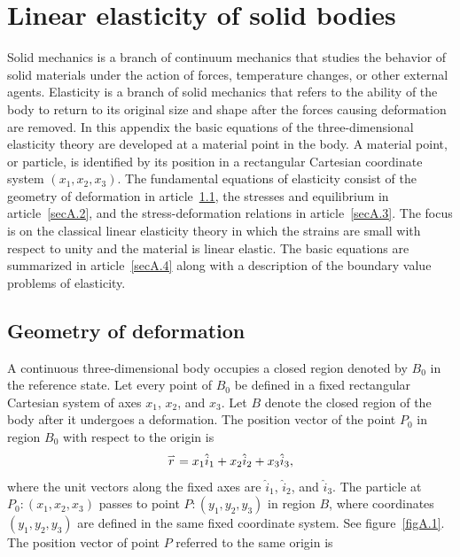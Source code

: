 \documentclass{AeroStructure-ERJohnson}
\def\harp#1{\smash{\mathord{\buildrel{\lower3pt\hbox{$\scriptscriptstyle\rightharpoonup$}}\over{#1}}}}
\begin{document}
\mainmatter



\appendix

\chapter{Linear elasticity of solid bodies} \label{appendix}

Solid mechanics is a branch of continuum mechanics that studies the behavior of solid materials under the action of forces, temperature changes, or other external agents. Elasticity is a branch of solid mechanics that refers to the ability of the body to return to its original size and shape after the forces causing deformation are removed. In this appendix the basic equations of the three-dimensional elasticity theory are developed at a material point in the body. A material point, or particle, is identified by its position in a rectangular Cartesian coordinate system $(x_{1},x_{2},x_{3})$. The fundamental equations of elasticity consist of the geometry of deformation in article~\ref{secA.1}, the stresses and equilibrium in article~\ref{secA.2}, and the stress-deformation relations in article~\ref{secA.3}. The focus is on the classical linear elasticity theory in which the strains are small with respect to unity and the material is linear elastic. The basic equations are summarized in article~\ref{secA.4} along with a description of the boundary value problems of elasticity.


\section{Geometry of deformation}\label{secA.1}

A continuous three-dimensional body occupies a closed region denoted by $B_{0}$ in the reference state. Let every point of $B_{0}$ be defined in a fixed rectangular Cartesian system of axes $x_{1}$, $x_{2}$, and $x_{3}$. Let $B$ denote the closed region of the body after it undergoes a deformation. The position vector of the point $P_{0}$ in region $B_{0}$ with respect to the origin is
\begin{equation}
\harp{r}=x_{1}\hat{i}_{1}+x_{2}\hat{i}_{2}+x_{3}\hat{i}_{3}, \label{eqA.1}
\end{equation}
\noindent where the unit vectors along the fixed axes are $\hat{i}_{1}$, $\hat{i}_{2}$, and $\hat{i}_{3}$. The particle at $P_{0}{:}(x_{1}, x_{2}, x_{3})$ passes to point $P{:}(y_{1}, y_{2}, y_{3})$ in region $B$, where coordinates $(y_1, y_{2}, y_{3})$ are defined in the same fixed coordinate system. See figure~\ref{figA.1}. The position vector of point $P$ referred to the same origin is
\end{document}
